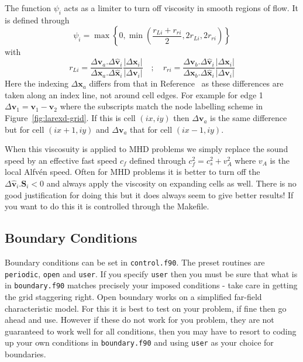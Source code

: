 \documentclass[11pt]{article}
\begin{document}
The function $\psi_i$ acts as a limiter to turn off viscosity in smooth regions of flow. It is defined through
\begin{equation}
  \psi_i=\max\left\{ 0, \min\left( \frac{r_{Li}+r_{ri}}{2},2r_{Li},2r_{ri}\right)\right\}
\end{equation}
with 
\begin{equation}
  r_{Li}=\frac{\Delta \mathbf{v}_{a}. \Delta \hat{\mathbf{v}}_i }{\Delta \mathbf{x}_{a} .\Delta \hat{\mathbf{x}}_i }
  \frac{|\Delta \mathbf{x}_{i}|}{|\Delta \mathbf{v}_{i}|}\quad ;\quad
  r_{ri}=\frac{\Delta \mathbf{v}_{b} .\Delta \hat{\mathbf{v}}_i }{\Delta \mathbf{x}_{b}. \Delta \hat{\mathbf{x}}_i }
  \frac{|\Delta \mathbf{x}_{i}|}{|\Delta \mathbf{v}_{i}|}
\end{equation}
Here the indexing $\Delta \mathbf{x}_{a} $ differs from that in Reference~\cite{caramana} as these differences
are taken along an index line, not around cell edges. For example for edge 1 
$\Delta \mathbf{v}_1 =\mathbf{v}_1-\mathbf{v}_2$ where the 
subscripts match the node labelling scheme in Figure~\ref{fig:larexd-grid}. If this is cell $(ix,iy)$ then 
$\Delta \mathbf{v}_{a} $ is the same difference but for cell $(ix+1,iy)$ and $\Delta \mathbf{v}_{a} $ that for cell
$(ix-1,iy)$. 

When this viscosuity is applied to MHD problems we simply replace the sound speed by an effective fast speed $c_f$
defined through $c_f^2=c_s^2 + v_A^2$ where $v_A$ is the local Alfv\'en speed. Often for MHD problems it is
better to turn off the $\Delta \hat{\mathbf{v}}_i . \mathbf{S}_i<0$ and always apply the viscosity on expanding
cells as well. There is no good justification for doing this but it does always seem to give better results!
If you want to do this it is controlled through the Makefile.

\subsection{Boundary Conditions}
Boundary conditions can be set in {\tt control.f90}. The preset routines are {\tt periodic}, 
{\tt open} and {\tt user}. If you specify {\tt user} then you must be sure that what is in {\tt boundary.f90} matches precisely your imposed conditions - take care in getting the grid staggering right. Open boundary works on a simplified far-field characteristic model. For this it is best to test on your problem, if fine then go ahead and use. However if these do not work for you problem, they are not guaranteed to work well for all conditions, then you may have to resort to coding up your own conditions in {\tt boundary.f90} and using {\tt user} as your choice for boundaries.
\end{document}
